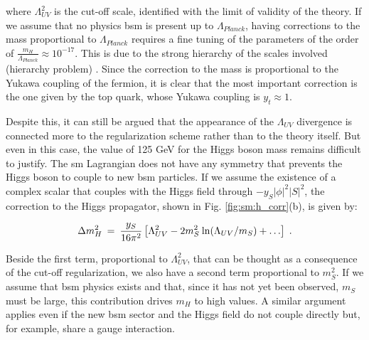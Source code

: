 \noindent where $\Lambda_{UV}^2$ is the cut-off scale, identified with the limit of validity of the theory. If we assume that no physics \gls{bsm} is present up to $\Lambda_{Planck}$, having corrections to the mass proportional to $\Lambda_{Planck}$ requires a fine tuning of the parameters of the order of $\frac{m_H}{\Lambda_{Planck}} \approx 10^{-17}$. This is due to the strong hierarchy of the scales involved (hierarchy problem) \cite{Weinberg:1975gm, PhysRevD.20.2619, PhysRevD.14.1667, tHooft:1979rat}. Since the correction to the mass is proportional to the Yukawa coupling of the fermion, it is clear that the most important correction is the one given by the top quark, whose Yukawa coupling is $y_t \approx 1$. %

Despite this, it can still be argued that the appearance of the $\Lambda_{UV}$ divergence is connected more to the regularization scheme rather than to the theory itself. But even in this case, the value of 125 GeV for the Higgs boson mass remains difficult to justify. The \gls{sm} Lagrangian does not have any symmetry that prevents the Higgs boson to couple to new \gls{bsm} particles. If we assume the existence of a complex scalar that couples with the Higgs field through $ -y_S|\phi|^2 |S|^2$, the correction to the Higgs propagator, shown in Fig. \ref{fig:sm:h_corr}(b), is given by:

\begin{equation}
\Delta m_H^2 \>=\> {y_S\over 16 \pi^2}
\left [\Lambda_{UV}^2 - 2 m_S^2
\> {\rm ln}(\Lambda_{UV}/m_S) + \ldots
\right ] \; .
\label{eq:divhs}
\end{equation}

\noindent Beside the first term, proportional to $\Lambda_{UV}^2$, that can be thought as a consequence of the cut-off regularization, we also have a second  term proportional to $m_S^2$. If we assume that \gls{bsm} physics exists and that, since it has not yet been observed, $m_S$ must be large, this contribution drives $m_H$ to high values. A similar argument applies even if the new \gls{bsm} sector and the Higgs field do not couple directly but, for example, share a gauge interaction.

